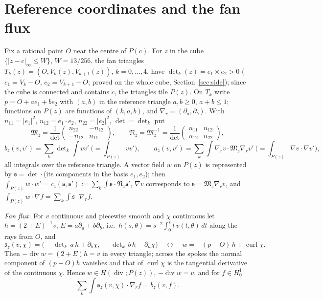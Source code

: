 \documentclass[11pt]{article}
\theoremstyle{remark}
\newcommand{\M}{\mathfrak{M}}
\newcommand{\N}{\mathfrak{N}}
\newcommand{\s}{\mathfrak{s}}
\newcommand{\gr}{\nabla_{\!r}}
\DeclareMathOperator{\dv}{div}
\DeclareMathOperator{\curl}{curl}
\begin{document}
\section{Reference coordinates and the fan flux}
Fix a rational point $O$ near the centre of $P(c)$. For $z$ in the cube $\{|z-c|_\infty\le W\}$, $W=13/256$, the fan
triangles $T_k(z)=(O,V_k(z),V_{k+1}(z))$, $k=0,\dots,4$, have $\det\nolimits_k(z)=e_1\times e_2>0$
($e_1=V_k-O$, $e_2=V_{k+1}-O$; proved on the whole cube, Section~\ref{sec:side}); since the cube is connected and
contains $c$, the triangles tile $P(z)$. On $T_k$ write $p=O+ae_1+be_2$ with $(a,b)$ in the reference triangle
$a,b\ge0$, $a+b\le1$; functions on $P(z)$ are functions of $(k,a,b)$, and $\gr=(\partial_a,\partial_b)$. With
$n_{11}=|e_1|^2$, $n_{12}=e_1\cdot e_2$, $n_{22}=|e_2|^2$, $\det=\det_k$ put
\[
\M_z=\frac1{\det}\begin{pmatrix}n_{22}&-n_{12}\\-n_{12}&n_{11}\end{pmatrix},\qquad
\N_z=\M_z^{-1}=\frac1{\det}\begin{pmatrix}n_{11}&n_{12}\\n_{12}&n_{22}\end{pmatrix},
\]
\[
b_z(v,v')=\sum_k\det\nolimits_k\!\int vv'\ \Big(=\int_{P(z)}vv'\Big),\qquad
a_z(v,v')=\sum_k\int\gr v\cdot\M_z\gr v'\ \Big(=\int_{P(z)}\nabla v\cdot\nabla v'\Big),
\]
all integrals over the reference triangle. A vector field $w$ on $P(z)$ is represented by $\s=\det\cdot$(its
components in the basis $e_1,e_2$); then $\int_{P(z)}w\cdot w'=c_z(\s,\s'):=\sum_k\int\s\cdot\N_z\s'$,
$\nabla v$ corresponds to $\s=\M_z\gr v$, and $\int_{P(z)}w\cdot\nabla f=\sum_k\int\s\cdot\gr f$.

\emph{Fan flux.} For $v$ continuous and piecewise smooth and $\chi$ continuous let $h=(2+E)^{-1}v$, $E=a\partial_a+
b\partial_b$, i.e.\ $h(s,\theta)=s^{-2}\int_0^st\,v(t,\theta)\,dt$ along the rays from $O$, and
\[
\s_z(v,\chi)=\big(-\det\nolimits_k\,a\,h+\partial_b\chi,\ -\det\nolimits_k\,b\,h-\partial_a\chi\big)
\quad\longleftrightarrow\quad w=-(p-O)\,h+\curl\chi .
\]
Then $-\dv w=(2+E)h=v$ in every triangle; across the spokes the normal component of $(p-O)h$ vanishes and that of
$\curl\chi$ is the tangential derivative of the continuous $\chi$. Hence $w\in H(\dv;P(z))$, $-\dv w=v$, and for
$f\in H^1_0$
\begin{equation}\label{eq:IP}
\sum_k\int\s_z(v,\chi)\cdot\gr f=b_z(v,f).
\end{equation}
\end{document}
